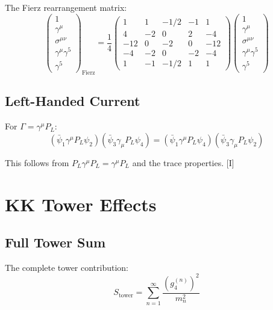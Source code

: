 \documentclass[11pt,a4paper]{article}
\begin{document}
The Fierz rearrangement matrix:
\begin{equation}
\begin{pmatrix}
1 \\ \gamma^\mu \\ \sigma^{\mu\nu} \\ \gamma^\mu\gamma^5 \\ \gamma^5
\end{pmatrix}_{\text{Fierz}}
= \frac{1}{4}
\begin{pmatrix}
1 & 1 & -1/2 & -1 & 1 \\
4 & -2 & 0 & 2 & -4 \\
-12 & 0 & -2 & 0 & -12 \\
-4 & -2 & 0 & -2 & -4 \\
1 & -1 & -1/2 & 1 & 1
\end{pmatrix}
\begin{pmatrix}
1 \\ \gamma^\mu \\ \sigma^{\mu\nu} \\ \gamma^\mu\gamma^5 \\ \gamma^5
\end{pmatrix}
\label{eq:fierz-matrix}
\end{equation}

\subsection{Left-Handed Current}

For $\Gamma = \gamma^\mu P_L$:
\begin{equation}
(\bar{\psi}_1 \gamma^\mu P_L \psi_2)(\bar{\psi}_3 \gamma_\mu P_L \psi_4)
= (\bar{\psi}_1 \gamma^\mu P_L \psi_4)(\bar{\psi}_3 \gamma_\mu P_L \psi_2)
\label{eq:fierz-ll}
\end{equation}

This follows from $P_L \gamma^\mu P_L = \gamma^\mu P_L$ and the trace properties. [I]

\section{KK Tower Effects}
\label{app:tower}

\subsection{Full Tower Sum}

The complete tower contribution:
\begin{equation}
S_{\text{tower}} = \sum_{n=1}^{\infty} \frac{(g_4^{(n)})^2}{m_n^2}
\label{eq:full-tower}
\end{equation}
\end{document}
